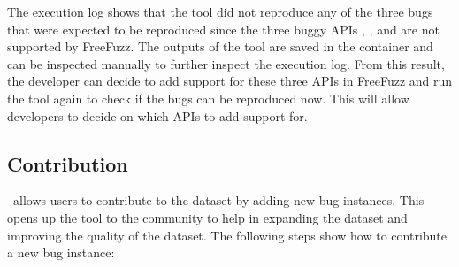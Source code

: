\documentclass[sigconf,screen]{acmart}
\begin{document}



The execution log shows that the tool did not reproduce any of the
three bugs that were expected to be reproduced since the three buggy APIs , , and  are not supported by FreeFuzz. The outputs of the tool are saved in the container and can be inspected manually to further inspect the execution log. From this result, the developer can decide to add support for these three APIs in FreeFuzz and run the tool again to check if the bugs can be reproduced now. This will allow developers to decide on which APIs to add support for.

\subsection{Contribution}

\tname\ allows users to contribute to the dataset by adding new bug
instances. This opens up the tool to the community to help in
expanding the dataset and improving the quality of the dataset.
The following steps show how to contribute a new bug
instance:
\end{document}
